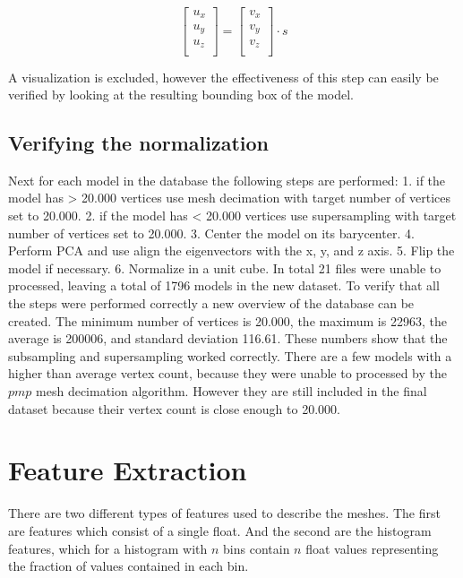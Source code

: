 \documentclass{bigdata}
\begin{document}
\[
\begin{bmatrix}
u_x \\
u_y \\
u_z \\
\end{bmatrix}
=
\begin{bmatrix}
v_x \\
v_y \\
v_z \\
\end{bmatrix}
\cdot s
\]

A visualization is excluded, however the effectiveness of this step can easily be verified by looking at the resulting bounding box of the model.

\subsection{Verifying the normalization}
Next for each model in the database the following steps are performed: 
1. if the model has > 20.000 vertices use mesh decimation with target number of vertices set to 20.000.
2. if the model has < 20.000 vertices use supersampling with target number of vertices set to 20.000.
3. Center the model on its barycenter.
4. Perform PCA and use align the eigenvectors with the x, y, and z axis.
5. Flip the model if necessary.
6. Normalize in a unit cube.
In total 21 files were unable to processed, leaving a total of 1796 models in the new dataset. To verify that all the steps were performed correctly a new overview of the database can be created. The minimum number of vertices is 20.000, the maximum is 22963, the average is 200006, and standard deviation 116.61. These numbers show that the subsampling and supersampling worked correctly. There are a few models with a higher than average vertex count, because they were unable to processed by the $pmp$ mesh decimation algorithm. However they are still included in the final dataset because their vertex count is close enough to 20.000.

\section{Feature Extraction}

There are two different types of features used to describe the meshes. The first are  features which consist of a single float. And the second are the histogram features, which for a histogram with $n$ bins contain $n$ float values representing the fraction of values contained in each bin. 
\end{document}
